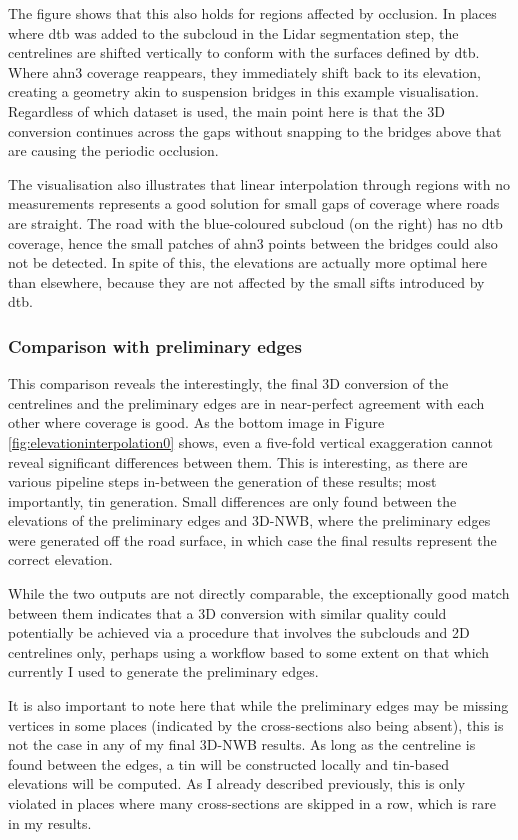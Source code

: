 The figure shows that this also holds for regions affected by occlusion. In places where \ac{dtb} was added to the subcloud in the Lidar segmentation step, the centrelines are shifted vertically to conform with the surfaces defined by \ac{dtb}. Where \ac{ahn3} coverage reappears, they immediately shift back to its elevation, creating a geometry akin to suspension bridges in this example visualisation. Regardless of which dataset is used, the main point here is that the 3D conversion continues across the gaps without snapping to the bridges above that are causing the periodic occlusion.

The visualisation also illustrates that linear interpolation through regions with no measurements represents a good solution for small gaps of coverage where roads are straight. The road with the blue-coloured subcloud (on the right) has no \ac{dtb} coverage, hence the small patches of \ac{ahn3} points between the bridges could also not be detected. In spite of this, the elevations are actually more optimal here than elsewhere, because they are not affected by the small sifts introduced by \ac{dtb}.

\subsubsection{Comparison with preliminary edges}

This comparison reveals the interestingly, the final 3D conversion of the centrelines and the preliminary edges are in near-perfect agreement with each other where coverage is good. As the bottom image in Figure \ref{fig:elevationinterpolation0} shows, even a five-fold vertical exaggeration cannot reveal significant differences between them. This is interesting, as there are various pipeline steps in-between the generation of these results; most importantly, \ac{tin} generation. Small differences are only found between the elevations of the preliminary edges and 3D-NWB, where the preliminary edges were generated off the road surface, in which case the final results represent the correct elevation.

While the two outputs are not directly comparable, the exceptionally good match between them indicates that a 3D conversion with similar quality could potentially be achieved via a procedure that involves the subclouds and 2D centrelines only, perhaps using a workflow based to some extent on that which currently I used to generate the preliminary edges.

It is also important to note here that while the preliminary edges may be missing vertices in some places (indicated by the cross-sections also being absent), this is not the case in any of my final 3D-NWB results. As long as the centreline is found between the edges, a \ac{tin} will be constructed locally and \ac{tin}-based elevations will be computed. As I already described previously, this is only violated in places where many cross-sections are skipped in a row, which is rare in my results.

